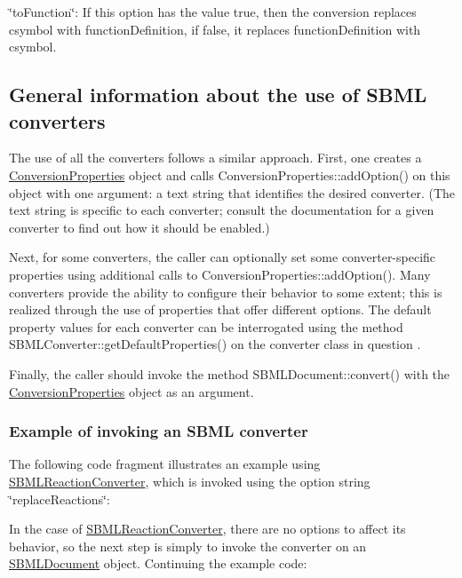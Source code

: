 \begin{DoxyItemize}
\item {\ttfamily \char`\"{}to\+Function\char`\"{}}\+: If this option has the value {\ttfamily true}, then the conversion replaces csymbol with function\+Definition, if {\ttfamily false}, it replaces function\+Definition with csymbol.\end{DoxyItemize}
\hypertarget{classdoc__section__using__sbml__converters_using-converters}{}\subsection{General information about the use of S\+B\+M\+L converters}\label{classdoc__section__using__sbml__converters_using-converters}
The use of all the converters follows a similar approach. First, one creates a \hyperlink{class_conversion_properties}{Conversion\+Properties} object and calls Conversion\+Properties\+::add\+Option() on this object with one argument\+: a text string that identifies the desired converter. (The text string is specific to each converter; consult the documentation for a given converter to find out how it should be enabled.)

Next, for some converters, the caller can optionally set some converter-\/specific properties using additional calls to Conversion\+Properties\+::add\+Option(). Many converters provide the ability to configure their behavior to some extent; this is realized through the use of properties that offer different options. The default property values for each converter can be interrogated using the method S\+B\+M\+L\+Converter\+::get\+Default\+Properties() on the converter class in question .

Finally, the caller should invoke the method S\+B\+M\+L\+Document\+::convert() with the \hyperlink{class_conversion_properties}{Conversion\+Properties} object as an argument.\hypertarget{classdoc__section__using__sbml__converters_converter-example}{}\subsubsection{Example of invoking an S\+B\+M\+L converter}\label{classdoc__section__using__sbml__converters_converter-example}
The following code fragment illustrates an example using \hyperlink{class_s_b_m_l_reaction_converter}{S\+B\+M\+L\+Reaction\+Converter}, which is invoked using the option string {\ttfamily \char`\"{}replace\+Reactions\char`\"{}}\+:

In the case of \hyperlink{class_s_b_m_l_reaction_converter}{S\+B\+M\+L\+Reaction\+Converter}, there are no options to affect its behavior, so the next step is simply to invoke the converter on an \hyperlink{class_s_b_m_l_document}{S\+B\+M\+L\+Document} object. Continuing the example code\+:

